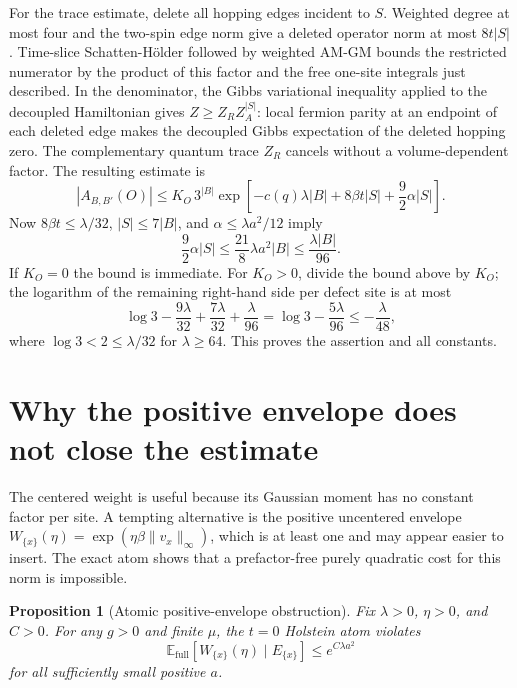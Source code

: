 \documentclass[11pt]{article}
\newtheorem{proposition}{Proposition}
\theoremstyle{remark}
\newcommand{\E}{\mathbb{E}}
\newcommand{\full}{\mathrm{full}}
\begin{document}
For the trace estimate, delete all hopping edges incident to $S$. Weighted degree at most four and the two-spin edge norm give a deleted operator norm at most $8t|S|$. Time-slice Schatten-H\"older followed by weighted AM-GM bounds the restricted numerator by the product of this factor and the free one-site integrals just described. In the denominator, the Gibbs variational inequality applied to the decoupled Hamiltonian gives $Z\ge Z_R Z_A^{|S|}$: local fermion parity at an endpoint of each deleted edge makes the decoupled Gibbs expectation of the deleted hopping zero. The complementary quantum trace $Z_R$ cancels without a volume-dependent factor. The resulting estimate is
\[
 |A_{B,B'}(O)|\le K_O\,3^{|B|}
 \exp\!\left[-c(q)\lambda|B|+8\beta t|S|+\frac92\alpha|S|\right].
\]
Now $8\beta t\le\lambda/32$, $|S|\le7|B|$, and $\alpha\le\lambda a^2/12$ imply
\[
 \frac92\alpha|S|\le\frac{21}{8}\lambda a^2|B|
 \le\frac{\lambda|B|}{96}.
\]
If $K_O=0$ the bound is immediate. For $K_O>0$, divide the bound above by $K_O$; the logarithm of the remaining right-hand side per defect site is at most
\[
 \log3-\frac{9\lambda}{32}+\frac{7\lambda}{32}+\frac{\lambda}{96}
 =\log3-\frac{5\lambda}{96}
 \le-\frac{\lambda}{48},
\]
where $\log3<2\le\lambda/32$ for $\lambda\ge64$. This proves the assertion and all constants.

\section{Why the positive envelope does not close the estimate}

The centered weight is useful because its Gaussian moment has no constant factor per site. A tempting alternative is the positive uncentered envelope $W_{\{x\}}(\eta)=\exp(\eta\beta\|v_x\|_\infty)$, which is at least one and may appear easier to insert. The exact atom shows that a prefactor-free purely quadratic cost for this norm is impossible.

\begin{proposition}[Atomic positive-envelope obstruction]
Fix $\lambda>0$, $\eta>0$, and $C>0$. For any $g>0$ and finite $\mu$, the $t=0$ Holstein atom violates
\[
 \E_{\full}[W_{\{x\}}(\eta)\mid E_{\{x\}}]\le e^{C\lambda a^2}
\]
for all sufficiently small positive $a$.
\end{proposition}
\end{document}
